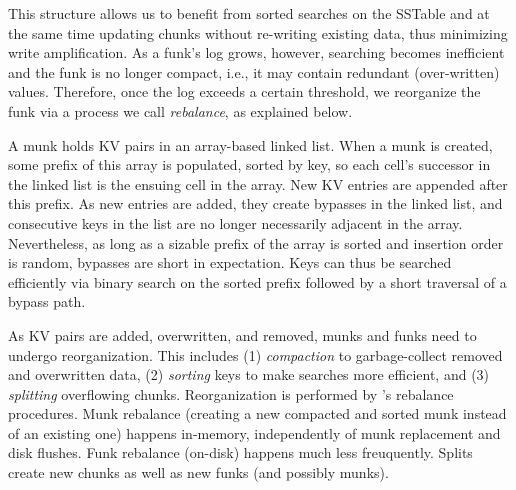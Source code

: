 This structure allows us to benefit from sorted searches on the {SSTable} and at the same time
updating chunks without re-writing existing data, thus minimizing write amplification.
As a funk's {log}  grows, however, searching becomes inefficient   and  
the funk is no longer compact, i.e., it may contain redundant (over-written) values.
Therefore, once the {log}  exceeds a certain threshold, we reorganize the funk
via a process we call \emph{rebalance}, as explained below.


A munk holds KV pairs in an array-based linked list.  
When a munk is created, some prefix of this array is populated,
sorted by key, so each cell's successor in the linked list is the ensuing cell in the array.
New KV entries are appended after this prefix.
As new entries are added, they create bypasses in the linked list, and consecutive keys in the
list are no longer necessarily adjacent in the array. Nevertheless, as long as 
a sizable prefix of the  array  is sorted and insertion order is random, bypasses are short in expectation.
Keys can thus be searched efficiently via binary search on the sorted prefix followed by a short traversal 
of a bypass path. %

As KV pairs are added, overwritten, and removed, munks and funks need to undergo reorganization. This includes  
(1) \emph{compaction} to garbage-collect removed and overwritten data, 
(2) \emph{sorting} keys to make searches more efficient,  and
(3) \emph{splitting} overflowing chunks.
Reorganization is performed by \sys's rebalance procedures. 
Munk rebalance (creating a new compacted and sorted munk instead of an existing one) 
happens in-memory, independently of munk replacement and disk flushes. 
Funk rebalance (on-disk) happens much less freuquently. 
Splits  create new chunks as well as new  funks (and possibly munks).

